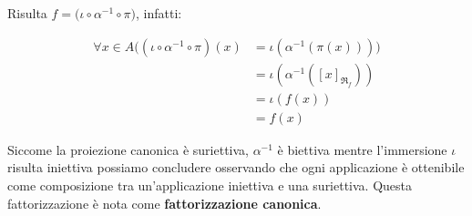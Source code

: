 Risulta $f = \bigl(\iota \circ \alpha^{-1} \circ \pi \bigr)$, infatti:

\begin{align*}
	\forall x \in A \bigl((\iota \circ \alpha^{-1} \circ \pi)(x) &= \iota(\alpha^{-1}(\pi(x)))\bigr) \\
	&= \iota(\alpha^{-1}([x]_{\mathfrak{R}_{f}})) \\
	&= \iota(f(x)) \\
	&= f(x)
\end{align*}

Siccome la proiezione canonica è suriettiva, $\alpha^{-1}$ è biettiva mentre l'immersione $\iota$ risulta iniettiva possiamo concludere osservando che ogni applicazione è ottenibile come composizione tra un'applicazione iniettiva e una suriettiva. Questa fattorizzazione è nota come \textbf{fattorizzazione canonica}.

